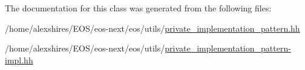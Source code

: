 The documentation for this class was generated from the following files:\begin{DoxyCompactItemize}
\item 
/home/alexshires/EOS/eos-\/next/eos/utils/\hyperlink{private__implementation__pattern_8hh}{private\_\-implementation\_\-pattern.hh}\item 
/home/alexshires/EOS/eos-\/next/eos/utils/\hyperlink{private__implementation__pattern-impl_8hh}{private\_\-implementation\_\-pattern-\/impl.hh}\end{DoxyCompactItemize}
